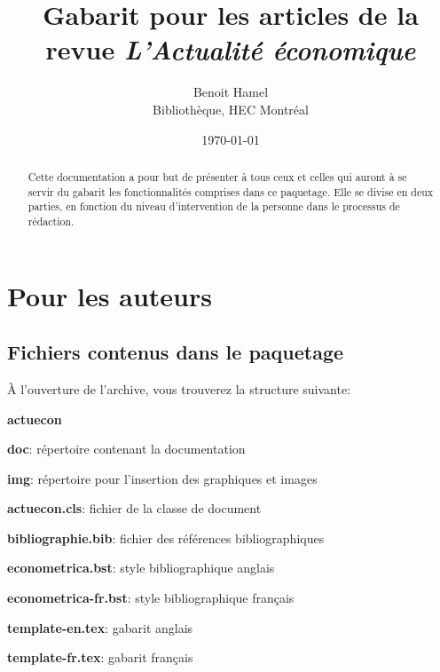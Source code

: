 \documentclass[french]{article}
\title{Gabarit pour les articles de la revue \emph{L'Actualité économique}}
\author{Benoit Hamel \\ Bibliothèque, HEC Montréal}
\date{\today}
\begin{document}
	\maketitle
	
	\begin{abstract}
		Cette documentation a pour but de présenter à tous ceux et celles qui auront à se servir du gabarit
		les fonctionnalités comprises dans ce paquetage. Elle se divise en deux parties, en fonction du
		niveau d'intervention de la personne dans le processus de rédaction.
	\end{abstract}
	
	\tableofcontents
		
	\section{Pour les auteurs}
		\label{sec:auteurs}		
		
		\subsection{Fichiers contenus dans le paquetage}
		
			À l'ouverture de l'archive, vous trouverez la structure suivante:
			
			\begin{repertoires}
				\item \textbf{actuecon}
				\begin{repertoires}
					\item \textbf{doc}: répertoire contenant la documentation
					\item \textbf{img}: répertoire pour l'insertion des graphiques et images
				\end{repertoires}
				\begin{fichiers}
					\item \textbf{actuecon.cls}: fichier de la classe de document
					\item \textbf{bibliographie.bib}: fichier des références bibliographiques
					\item \textbf{econometrica.bst}: style bibliographique anglais
					\item \textbf{econometrica-fr.bst}: style bibliographique français
					\item \textbf{template-en.tex}: gabarit anglais
					\item \textbf{template-fr.tex}: gabarit français
				\end{fichiers}
			\end{repertoires}
		
\end{document}
